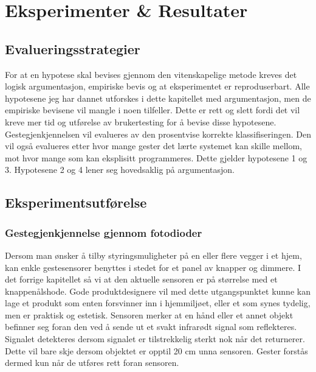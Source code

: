 \section[Eksperimenter \& Resultater]{Eksperimenter \& Resultater}
\subsection{Evalueringsstrategier}
For at en hypotese skal bevises gjennom den vitenskapelige metode kreves det logisk argumentasjon, empiriske bevis og at eksperimentet er reproduserbart. Alle hypotesene jeg har dannet utforskes i dette kapitellet med argumentasjon, men de empiriske bevisene vil mangle i noen tilfeller. Dette er rett og slett fordi det vil kreve mer tid og utførelse av brukertesting for å bevise disse hypotesene. Gestegjenkjennelsen vil evalueres av den prosentvise korrekte klassifiseringen. Den vil også evalueres etter hvor mange gester det lærte systemet kan skille mellom, mot hvor mange som kan eksplisitt programmeres. Dette gjelder hypotesene 1 og 3. Hypotesene 2 og 4 lener seg hovedsaklig på argumentasjon.\\

\subsection{Eksperimentsutførelse}
\subsubsection*{Gestegjenkjennelse gjennom fotodioder}
Dersom man ønsker å tilby styringsmuligheter på en eller flere vegger i et hjem, kan enkle gestesensorer benyttes i stedet for et panel av knapper og dimmere. I det forrige kapitellet så vi at den aktuelle sensoren er på størrelse med et knappenålshode. Gode produktdesignere vil med dette utgangspunktet kunne kan lage et produkt som enten forsvinner inn i hjemmiljøet, eller et som synes tydelig, men er praktisk og estetisk. Sensoren merker at en hånd eller et annet objekt befinner seg foran den ved å sende ut et svakt infrarødt signal som reflekteres. Signalet detekteres dersom signalet er tilstrekkelig sterkt nok når det returnerer. Dette vil bare skje dersom objektet er opptil 20 cm unna sensoren. Gester forstås dermed kun når de utføres rett foran sensoren.

